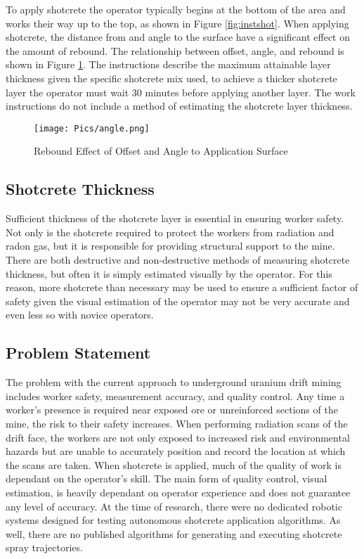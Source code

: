 To apply shotcrete the operator typically begins at the bottom of the area and works their way up to the top, as shown in Figure \ref{fig:instshot}. When applying shotcrete, the distance from and angle to the surface have a significant effect on the amount of rebound. The relationship between offset, angle, and rebound is shown in Figure \ref{fig:rebound}. The instructions describe the maximum attainable layer thickness given the specific shotcrete mix used, to achieve a thicker shotcrete layer the operator must wait 30 minutes before applying another layer. The work instructions do not include a method of estimating the shotcrete layer thickness.\\

\begin{figure}
    \centering
    \texttt{[image: Pics/angle.png]}
    \caption{Rebound Effect of Offset and Angle to Application Surface \cite{camedoc}}
    \label{fig:rebound}
\end{figure}

\subsection{Shotcrete Thickness}

Sufficient thickness of the shotcrete layer is essential in ensuring worker safety. Not only is the shotcrete required to protect the workers from radiation and radon gas, but it is responsible for providing structural support to the mine. There are both destructive and non-destructive methods of measuring shotcrete thickness, but often it is simply estimated visually by the operator. For this reason, more shotcrete than necessary may be used to ensure a sufficient factor of safety given the visual estimation of the operator may not be very accurate and even less so with novice operators.\\

\subsection{Problem Statement}

The problem with the current approach to underground uranium drift mining includes worker safety, measurement accuracy, and quality control. Any time a worker's presence is required near exposed ore or unreinforced sections of the mine, the risk to their safety increases. When performing radiation scans of the drift face, the workers are not only exposed to increased risk and environmental hazards but are unable to accurately position and record the location at which the scans are taken. When shotcrete is applied, much of the quality of work is dependant on the operator's skill. The main form of quality control, visual estimation, is heavily dependant on operator experience and does not guarantee any level of accuracy. At the time of research, there were no dedicated robotic systems designed for testing autonomous shotcrete application algorithms. As well, there are no published algorithms for generating and executing shotcrete spray trajectories.\\

